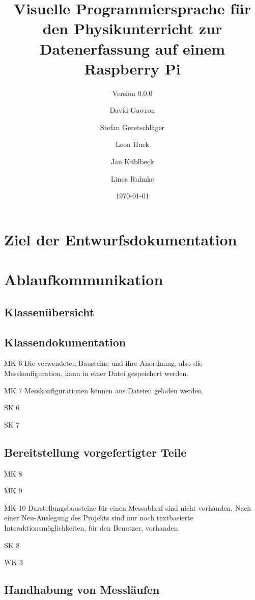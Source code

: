 \documentclass[parskip=full]{scrartcl}
\title{Visuelle Programmiersprache für den Physikunterricht zur Datenerfassung auf einem Raspberry Pi}
\subtitle{Version 0.0.0}
\author{David Gawron \and Stefan Geretschläger \and Leon Huck \and Jan Küblbeck \and Linus Ruhnke}
\date{\today}
\begin{document}
\maketitle

\clearpage
\tableofcontents 					%

\clearpage
\section{Ziel der Entwurfsdokumentation}

\clearpage
\section{Ablaufkommunikation}

\subsection{Klassenübersicht}

\subsection{Klassendokumentation}


\begin{description}
\item{MK 6} Die verwendeten Bausteine und ihre Anordnung, also die Messkonfiguration, kann in einer Datei gespeichert werden.
\item{MK 7} Messkonfigurationen können aus Dateien geladen werden.
\item{SK 6}
\item{SK 7}
\end{description}

\subsection {Bereitstellung vorgefertigter Teile}

\item{MK 8} 
\item{MK 9} 
\item{MK 10} Darstellungsbausteine für einen Messablauf sind nicht vorhanden. Nach einer Neu-Auslegung des Projekts sind nur noch textbasierte Interaktionsmöglichkeiten, für den Benutzer, vorhanden.
\item{SK 8} 
\item{WK 3} 

\subsection{Handhabung von Messläufen}
\end{document}
